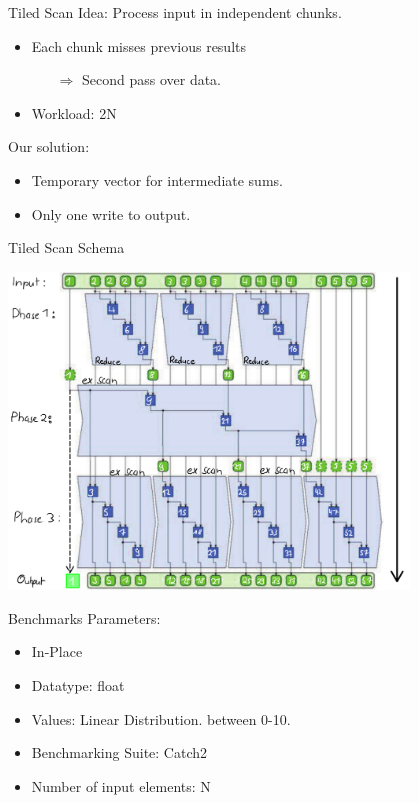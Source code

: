 \begin{frame}{Tiled Scan} 
Idea: Process input in independent chunks.
\begin{itemize}
 \item Each chunk misses previous results
 \begin{itemize}
 \item[$\Rightarrow$] Second pass over data.
 \end{itemize}
 \item Workload: 2N
\end{itemize}
\vspace{10pt}
Our solution:
\begin{itemize}
 \item Temporary vector for intermediate sums.
 \item Only one write to output.
\end{itemize}

\end{frame} 

\begin{frame}{Tiled Scan Schema}
 
  \centering
  \includegraphics[width=0.80\textwidth]{"wiki/3Phase Nice"}
 
\end{frame}

\begin{frame}{Benchmarks}
Parameters:
\begin{itemize}
 \item In-Place
 \item Datatype: float
 \item Values: Linear Distribution. between 0-10.
 \item Benchmarking Suite: Catch2
 \item Number of input elements: N
\end{itemize}


\end{frame}

